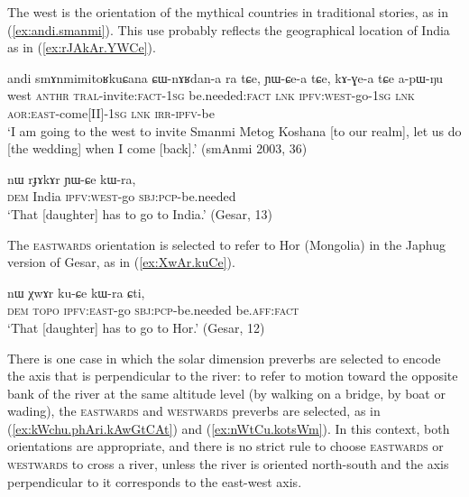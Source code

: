 The west is the orientation of the mythical countries in traditional stories, as in (\ref{ex:andi.smanmi}). This use probably reflects the geographical location of India as in (\ref{ex:rJAkAr.YWCe}).

\begin{exe}
\ex \label{ex:andi.smanmi}
\gll andi smɤnmimitoʁkuɕana ɕɯ-nɤʁdan-a ra tɕe, ɲɯ-ɕe-a tɕe, kɤ-ɣe-a tɕe a-pɯ-ŋu \\
west  \textsc{anthr} \textsc{tral}-invite:\textsc{fact}-\textsc{1sg} be.needed:\textsc{fact} \textsc{lnk} \textsc{ipfv}:\textsc{west}-go-\textsc{1sg} \textsc{lnk} \textsc{aor}:\textsc{east}-come[II]-\textsc{1sg} \textsc{lnk} \textsc{irr}-\textsc{ipfv}-be \\
\glt `I am going to the west to invite Smanmi Metog Koshana [to our realm], let us do [the wedding] when I come [back].' (smAnmi 2003, 36)
\end{exe}

\begin{exe}
\ex \label{ex:rJAkAr.YWCe}
\gll nɯ rɟɤkɤr ɲɯ-ɕe kɯ-ra, \\
\textsc{dem} India \textsc{ipfv}:\textsc{west}-go \textsc{sbj}:\textsc{pcp}-be.needed \\
\glt `That [daughter] has to go to India.' (Gesar, 13)
\end{exe}

The \textsc{eastwards} orientation is selected to refer to Hor (Mongolia) in the Japhug version of Gesar, as in (\ref{ex:XwAr.kuCe}).

\begin{exe}
\ex \label{ex:XwAr.kuCe}
\gll  nɯ χwɤr ku-ɕe kɯ-ra ɕti, \\
\textsc{dem}  \textsc{topo} \textsc{ipfv}:\textsc{east}-go \textsc{sbj}:\textsc{pcp}-be.needed be.\textsc{aff}:\textsc{fact} \\
\glt `That [daughter] has to go to Hor.' (Gesar, 12)
\end{exe} 


There is one case in which the solar dimension preverbs are selected to encode the axis that is perpendicular to the river: to refer to motion toward the opposite bank of the river at the same altitude level (by walking on a bridge, by boat or wading), the \textsc{eastwards} and \textsc{westwards} preverbs are selected, as in (\ref{ex:kWchu.phAri.kAwGtCAt}) and (\ref{ex:nWtCu.kotsWm}). In this context, both orientations are appropriate, and there is no strict rule to choose \textsc{eastwards} or \textsc{westwards} to cross a river, unless the river is oriented north-south and the axis perpendicular to it corresponds to the east-west axis.

